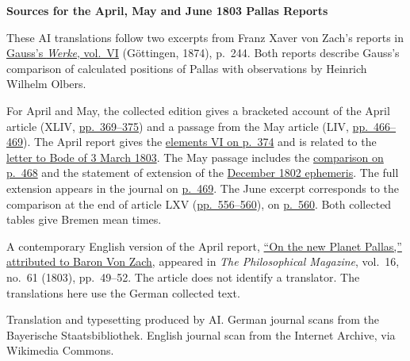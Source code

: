 \clearpage\thispagestyle{empty}
\begin{center}\textbf{Sources for the April, May and June 1803 Pallas Reports}\end{center}
\noindent These AI translations follow two excerpts from Franz Xaver von Zach’s reports in \href{https://gdz.sub.uni-goettingen.de/id/PPN236007467}{Gauss’s \textit{Werke}, vol.~VI} (Göttingen, 1874), p.~244. Both reports describe Gauss’s comparison of calculated positions of Pallas with observations by Heinrich Wilhelm Olbers.
\par\smallskip\noindent For April and May, the collected edition gives a bracketed account of the April article (XLIV, \href{https://api.digitale-sammlungen.de/iiif/image/v2/bsb10538599_00387/full/1450,/0/default.jpg}{pp.~369--375}) and a passage from the May article (LIV, \href{https://api.digitale-sammlungen.de/iiif/image/v2/bsb10538599_00486/full/1450,/0/default.jpg}{pp.~466--469}). The April report gives the \href{https://api.digitale-sammlungen.de/iiif/image/v2/bsb10538599_00392/full/1450,/0/default.jpg}{elements VI on p.~374} and is related to the \href{https://api.digitale-sammlungen.de/iiif/image/v2/bsb10538335_00189/full/1450,/0/default.jpg}{letter to Bode of 3 March 1803}. The May passage includes the \href{https://api.digitale-sammlungen.de/iiif/image/v2/bsb10538599_00488/full/1450,/0/default.jpg}{comparison on p.~468} and the statement of extension of the \href{https://api.digitale-sammlungen.de/iiif/image/v2/bsb10538598_00597/full/1450,/0/default.jpg}{December 1802 ephemeris}. The full extension appears in the journal on \href{https://api.digitale-sammlungen.de/iiif/image/v2/bsb10538599_00489/full/1450,/0/default.jpg}{p.~469}. The June excerpt corresponds to the comparison at the end of article LXV (\href{https://api.digitale-sammlungen.de/iiif/image/v2/bsb10538599_00580/full/1450,/0/default.jpg}{pp.~556--560}), on \href{https://api.digitale-sammlungen.de/iiif/image/v2/bsb10538599_00584/full/1450,/0/default.jpg}{p.~560}. Both collected tables give Bremen mean times.
\par\smallskip\noindent A contemporary English version of the April report, \href{https://upload.wikimedia.org/wikipedia/commons/d/d6/The_philosophical_magazine._Volume_16%2C_1803._%28IA_s2id13415870%29.pdf#page=53}{“On the new Planet Pallas,” attributed to Baron Von Zach}, appeared in \textit{The Philosophical Magazine}, vol.~16, no.~61 (1803), pp.~49--52. The article does not identify a translator. The translations here use the German collected text.
\par\smallskip\noindent Translation and typesetting produced by AI. German journal scans from the Bayerische Staatsbibliothek. English journal scan from the Internet Archive, via Wikimedia Commons.
\clearpage
